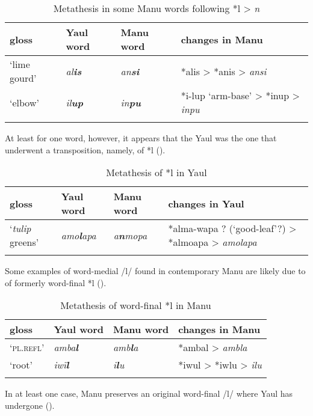 \begin{table}
\caption{Metathesis in some Manu words following *l > \textit{n}}
\label{tab:18.4}


\begin{tabularx}{\textwidth}{lllQ}

\lsptoprule

gloss & Yaul word & Manu word & changes in Manu\\
\midrule
‘lime gourd’ & {\itshape al\textbf{is}} & {\itshape an\textbf{si}} & *alis > *anis > \textit{ansi}\\
‘elbow’ & {\itshape il\textbf{up}} & {\itshape in\textbf{pu}} & *i-lup ‘arm-base’ > *inup > \textit{inpu}\\
\lspbottomrule
\end{tabularx}
\end{table}

At least for one word, however, it appears that the Yaul  was the one that underwent a transposition, namely, of *l ().

\begin{table}
\caption{Metathesis of *l in Yaul}
\label{tab:18.5}


\begin{tabularx}{\textwidth}{lllQ}

\lsptoprule

gloss & Yaul word & Manu word & changes in Yaul\\
\midrule
‘\textit{tulip} greens’ & {\itshape amo\textbf{l}apa} & {\itshape a\textbf{n}mopa} & *alma-wapa ? (‘good-leaf’?) > *almoapa > \textit{amolapa}\\
\lspbottomrule
\end{tabularx}
\end{table}
Some examples of word-medial /l/ found in contemporary Manu are likely due to  of formerly word-final *l ().


\begin{table}
\caption{Metathesis of word-final *l in Manu}
\label{tab:18.6}


\begin{tabular}{llll}

\lsptoprule

gloss & Yaul word & Manu word & changes in Manu\\
\midrule
‘\textsc{pl.refl}’ & {\itshape amba\textbf{l}} & {\itshape amb\textbf{l}a} & *ambal > \textit{ambla}\\
‘root’ & {\itshape iwï\textbf{l}} & {\itshape i\textbf{l}u} & *iwul > *iwlu > \textit{ilu}\\
\lspbottomrule
\end{tabular}
\end{table}
In at least one case, Manu preserves an original word-final /l/ where Yaul has undergone  ().



